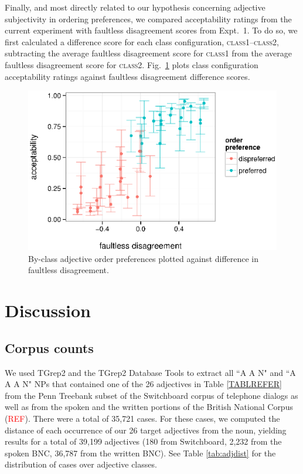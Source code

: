 \documentclass{pnastwo}
\newcommand{\tableref}[1]{Table \ref{#1}}
\newcommand{\red}[1]{\textcolor{Red}{#1}}
\begin{document}
\begin{article}
Finally, and most directly related to our hypothesis concerning adjective subjectivity in ordering preferences, we compared acceptability ratings from the current experiment with faultless disagreement scores from Expt.\ 1. To do so, we first calculated a difference score for each class configuration, \textsc{class1}--\textsc{class2}, subtracting the average faultless disagreement score for \textsc{class1} from the average faultless disagreement score for \textsc{class2}. Fig.\ \ref{faultless-order} plots class configuration acceptability ratings against faultless disagreement difference scores.

\begin{figure}[h]
	\centering
	\includegraphics[width=\linewidth]{plots/faultless_order_preference.eps}
	\caption{By-class adjective order preferences plotted against difference in faultless disagreement.}\label{faultless-order}
\end{figure}






\section{Discussion}



\begin{materials}
\section{Corpus counts} 

We used TGrep2 \cite{rohde2005} and the TGrep2 Database Tools \cite{degenjaeger-tdt} to extract all ``A A N" and ``A A A N" NPs that contained one of the 26 adjectives in Table \ref{TABLREFER} from the Penn Treebank subset of the Switchboard corpus of telephone dialogs \cite{godfrey1992} as well as from the spoken and the written portions of the British National Corpus (\red{REF}). There were a total of 35,721 cases. For these cases, we computed the distance of each occurrence of our 26 target adjectives from the noun, yielding results for a total of 39,199 adjectives (180 from Switchboard, 2,232 from the spoken BNC, 36,787 from the written BNC).  See \tableref{tab:adjdist} for the distribution of cases over adjective classes.


\end{materials}
\end{article}
\end{document}
